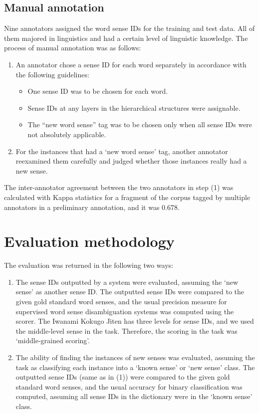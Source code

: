 \documentclass[english]{jnlp_1.4}
\begin{document}
\subsection{Manual annotation}

Nine annotators assigned the word sense IDs for the training and
test data. All of them majored in linguistics and had a certain level of linguistic knowledge. The
process of manual annotation was as follows:
\begin{enumerate}
\item An annotator chose a sense ID for each word separately in
accordance with the following guidelines:
\begin{itemize}
\item One sense ID was to be chosen for each word.
\item Sense IDs at any layers in the hierarchical structures were
      assignable.
\item The ``new word sense'' tag was to be chosen only when all sense
      IDs were not absolutely applicable.
\end{itemize}
\item For the instances that had a `new word sense' tag, another
      annotator reexamined them carefully and judged whether those instances really had
      a new sense.
\end{enumerate}
The inter-annotator agreement between the two annotators
  in step (1) was calculated with Kappa statistics for a fragment of the
  corpus tagged by multiple annotators in a preliminary annotation, and it was 0.678.


\section{Evaluation methodology}

The evaluation was returned in the following two ways:
\begin{enumerate}
\item The sense IDs outputted by a system were evaluated, assuming the `new sense' as
   another sense ID. The outputted sense IDs were compared to the
   given gold standard word senses, and the usual precision measure
   for supervised word sense disambiguation systems was computed
   using the scorer. The Iwanami Kokugo Jiten has
   three levels for sense IDs, and we used the middle-level sense in
   the task. Therefore, the scoring in the task was
   `middle-grained scoring'.
\item The ability of finding the instances of new senses was evaluated,
   assuming the task as classifying each instance into a `known sense'
   or `new sense' class. The outputted sense IDs (same as in (1)) were
   compared to the given gold standard word senses, and the usual
   accuracy for binary classification was computed, assuming all
   sense IDs in the dictionary were in the `known sense' class.
\end{enumerate}
\end{document}

